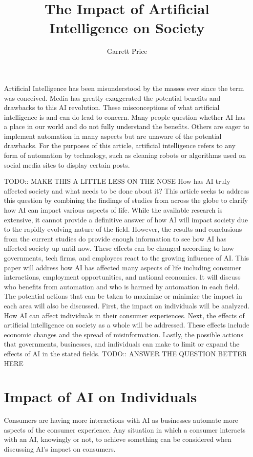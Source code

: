 \documentclass[12pt, man]{apa6}
\title{The Impact of Artificial Intelligence on Society}
\author{Garrett Price}
\affiliation{Brigham Young University}
\begin{document}
\maketitle

Artificial Intelligence has been misunderstood by the masses ever since the term was conceived.  Media has greatly exaggerated the potential
benefits and drawbacks to this AI revolution.  These misconceptions of what artificial intelligence is and can do lead to concern. Many people question
whether AI has a place in our world and do not fully understand the benefits. Others are eager to implement automation in many aspects but are unaware of the
potential drawbacks.  For the purposes of this article, artificial intelligence refers to any form of automation by technology, such as cleaning robots or algorithms used on social media sites to display certain posts.

TODO:: MAKE THIS A LITTLE LESS ON THE NOSE How has AI truly affected society and what needs to be done about it? This article seeks to address this question by combining the findings of studies from across the globe to clarify how AI can impact various aspects of life.  While the available research is extensive, it cannot provide a definitive answer of how AI will impact society due to the rapidly evolving nature of the field.  However, the results and conclusions from the current studies do provide enough information to see how AI has affected society up until now.  These effects can be changed according to how governments, tech firms, and employees react to the growing influence of AI.  This paper will address how AI has affected many aspects of life including consumer interactions, employment opportunities, and national economies.  It will discuss who benefits from automation and who is harmed by automation in each field.  The potential actions that can be taken to maximize or minimize the impact in each area will also be discussed.  First, the impact on individuals will be analyzed.  How AI can affect individuals in their consumer experiences.  Next, the effects of artificial intelligence on society as a whole will be addressed.  These effects include economic changes and the spread of misinformation.  Lastly, the possible actions that governments, businesses, and individuals can make to limit or expand the effects of AI in the stated fields. TODO:: ANSWER THE QUESTION BETTER HERE
\newpage
\section*{Impact of AI on Individuals}
Consumers are having more interactions with AI as businesses automate more aspects of the consumer experience.  Any situation in which a consumer interacts with an AI, knowingly or not, to achieve something can be considered when discussing AI's impact on consumers.\\
\end{document}
